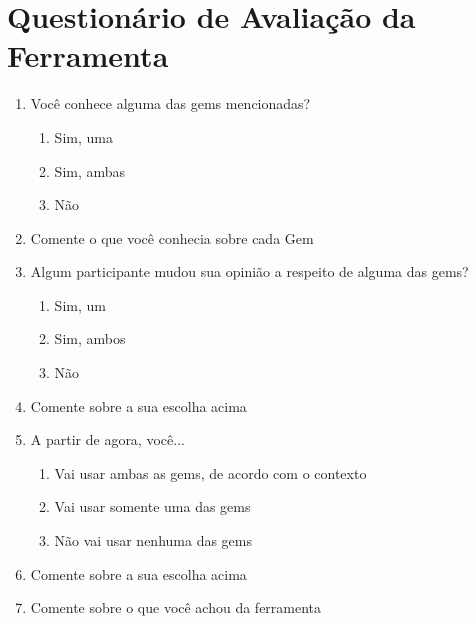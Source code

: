 \section{Questionário de Avaliação da Ferramenta}
\begin{enumerate}
  
  \item \hspace{1pt} Você conhece alguma das gems mencionadas?
    \begin{enumerate}
		\item \hspace{1pt} Sim, uma
        \item \hspace{1pt} Sim, ambas
        \item \hspace{1pt} Não
	\end{enumerate}
    
  \item \hspace{1pt} Comente o que você conhecia sobre cada Gem
  
  \item \hspace{1pt} Algum participante mudou sua opinião a respeito de alguma das gems?
  	\begin{enumerate}
  		\item \hspace{1pt} Sim, um
        \item \hspace{1pt} Sim, ambos
        \item \hspace{1pt} Não
    \end{enumerate}
  
  \item \hspace{1pt} Comente sobre a sua escolha acima
  
  \item \hspace{1pt} A partir de agora, você...
    \begin{enumerate}
  		\item \hspace{1pt} Vai usar ambas as gems, de acordo com o contexto
        \item \hspace{1pt} Vai usar somente uma das gems
        \item \hspace{1pt} Não vai usar nenhuma das gems
    \end{enumerate}
  
  \item \hspace{1pt} Comente sobre a sua escolha acima
  
  \item \hspace{1pt} Comente sobre o que você achou da ferramenta		

\end{enumerate}

